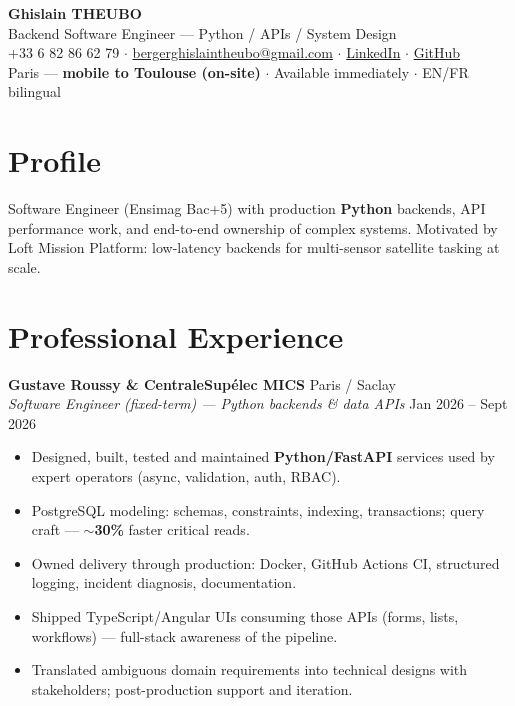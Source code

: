 \documentclass[10pt,a4paper]{article}
\begin{document}
\begin{center}
{\LARGE\bfseries Ghislain THEUBO}\\[1pt]
{\large Backend Software Engineer --- Python / APIs / System Design}\\[2pt]
+33 6 82 86 62 79 $\cdot$
\href{mailto:bergerghislaintheubo@gmail.com}{bergerghislaintheubo@gmail.com} $\cdot$
\href{https://www.linkedin.com/in/berger-ghislain}{LinkedIn} $\cdot$
\href{https://github.com/Bergerghislain}{GitHub}\\[1pt]
Paris --- \textbf{mobile to Toulouse (on-site)} $\cdot$ Available immediately $\cdot$ EN/FR bilingual
\end{center}

\section{Profile}
Software Engineer (Ensimag Bac+5) with production \textbf{Python} backends, API performance work, and end-to-end ownership of complex systems. Motivated by Loft Mission Platform: low-latency backends for multi-sensor satellite tasking at scale.

\section{Professional Experience}
\textbf{Gustave Roussy \& CentraleSup\'elec MICS} \hfill Paris / Saclay\\
\textit{Software Engineer (fixed-term) --- Python backends \& data APIs} \hfill Jan 2026 -- Sept 2026
\begin{itemize}
  \item Designed, built, tested and maintained \textbf{Python/FastAPI} services used by expert operators (async, validation, auth, RBAC).
  \item PostgreSQL modeling: schemas, constraints, indexing, transactions; query craft --- $\sim$\textbf{30\%} faster critical reads.
  \item Owned delivery through production: Docker, GitHub Actions CI, structured logging, incident diagnosis, documentation.
  \item Shipped TypeScript/Angular UIs consuming those APIs (forms, lists, workflows) --- full-stack awareness of the pipeline.
  \item Translated ambiguous domain requirements into technical designs with stakeholders; post-production support and iteration.
\end{itemize}
\end{document}
